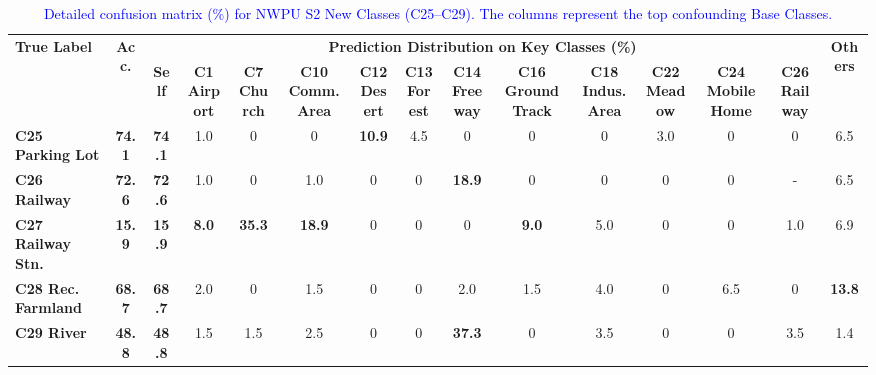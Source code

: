 ﻿\documentclass[letterpaper,journal]{IEEEtran}
\begin{document}
\begin{table}[t]
\centering
\caption{\textcolor{blue}{Detailed confusion matrix (\%) for NWPU S2 New Classes (C25--C29). The columns represent the top confounding Base Classes.}}
\label{tab:nwpu_s2_confusion}
{\setlength{\tabcolsep}{2.5pt}\scriptsize
\renewcommand{\arraystretch}{1.2}
\begin{tabular}{@{}lc ccccccccccccc@{}}
\toprule
\multirow{2}{*}{\textbf{True Label}} & \multirow{2}{*}{\textbf{Acc.}} & \multicolumn{12}{c}{\textbf{Prediction Distribution on Key Classes (\%)}} & \multirow{2}{*}{\textbf{Others}} \\
\cmidrule(lr){3-14}
 & & \textbf{Self} & \makecell{\textbf{C1}\\\textbf{Airport}} & \makecell{\textbf{C7}\\\textbf{Church}} & \makecell{\textbf{C10}\\\textbf{Comm. Area}} & \makecell{\textbf{C12}\\\textbf{Desert}} & \makecell{\textbf{C13}\\\textbf{Forest}} & \makecell{\textbf{C14}\\\textbf{Freeway}} & \makecell{\textbf{C16}\\\textbf{Ground Track}} & \makecell{\textbf{C18}\\\textbf{Indus. Area}} & \makecell{\textbf{C22}\\\textbf{Meadow}} & \makecell{\textbf{C24}\\\textbf{Mobile Home}} & \makecell{\textbf{C26}\\\textbf{Railway}} & \\
\midrule
\textbf{C25 Parking Lot} & \textbf{74.1} & \textbf{74.1} & 1.0 & 0 & 0 & \textbf{10.9} & 4.5 & 0 & 0 & 0 & 3.0 & 0 & 0 & 6.5 \\
\textbf{C26 Railway} & \textbf{72.6} & \textbf{72.6} & 1.0 & 0 & 1.0 & 0 & 0 & \textbf{18.9} & 0 & 0 & 0 & 0 & - & 6.5 \\
\textbf{C27 Railway Stn.} & \textbf{15.9} & \textbf{15.9} & \textbf{8.0} & \textbf{35.3} & \textbf{18.9} & 0 & 0 & 0 & \textbf{9.0} & 5.0 & 0 & 0 & 1.0 & 6.9 \\
\textbf{C28 Rec. Farmland} & \textbf{68.7} & \textbf{68.7} & 2.0 & 0 & 1.5 & 0 & 0 & 2.0 & 1.5 & 4.0 & 0 & 6.5 & 0 & \textbf{13.8} \\
\textbf{C29 River} & \textbf{48.8} & \textbf{48.8} & 1.5 & 1.5 & 2.5 & 0 & 0 & \textbf{37.3} & 0 & 3.5 & 0 & 0 & 3.5 & 1.4 \\
\bottomrule
\end{tabular}}
\end{table}
\end{document}
